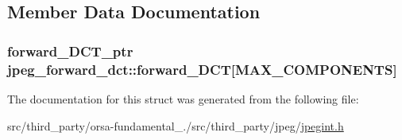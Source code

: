 \subsection{Member Data Documentation}
\hypertarget{structjpeg__forward__dct_a227dc1b935c81ac94fc81521be709faf}{}
\subsubsection[{forward\+\_\+\+D\+C\+T}]{\setlength{\rightskip}{0pt plus 5cm}forward\+\_\+\+D\+C\+T\+\_\+ptr jpeg\+\_\+forward\+\_\+dct\+::forward\+\_\+\+D\+C\+T\mbox{[}{\bf M\+A\+X\+\_\+\+C\+O\+M\+P\+O\+N\+E\+N\+T\+S}\mbox{]}}\label{structjpeg__forward__dct_a227dc1b935c81ac94fc81521be709faf}


The documentation for this struct was generated from the following file\+:\begin{DoxyCompactItemize}
\item 
src/third\+\_\+party/orsa-\/fundamental\+\_./src/third\+\_\+party/jpeg/\hyperlink{jpegint_8h}{jpegint.\+h}\end{DoxyCompactItemize}
